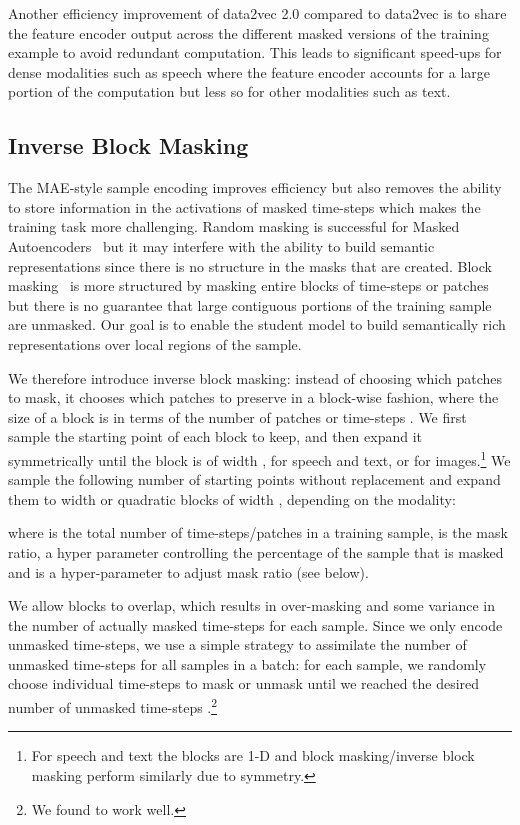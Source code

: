 \documentclass[nohyperref]{article}
\theoremstyle{plain}
\theoremstyle{definition}
\theoremstyle{remark}
\newcommand{\name}{data2vec 2.0}
\begin{document}
Another efficiency improvement of \name{} compared to data2vec is to share the feature encoder output across the different masked versions of the training example to avoid redundant computation.
This leads to significant speed-ups for dense modalities such as speech where the feature encoder accounts for a large portion of the computation but less so for other modalities such as text.



\subsection{Inverse Block Masking}
\label{sec:masking}

The MAE-style sample encoding improves efficiency but also removes the ability to store information in the activations of masked time-steps which makes the training task more challenging.
Random masking is successful for Masked Autoencoders~\citep{he2021mae} but it may interfere with the ability to build semantic representations since there is no structure in the masks that are created.
Block masking~\citep{bao2021beit} is more structured by masking entire blocks of time-steps or patches but there is no guarantee that large contiguous portions of the training sample are unmasked.
Our goal is to enable the student model to build semantically rich representations over local regions of the sample.

\insertEfficiencyPlot

We therefore introduce inverse block masking: instead of choosing which patches to mask, it chooses which patches to preserve in a block-wise fashion, where the size of a block is in terms of the number of patches or time-steps .
We first sample the starting point of each block to keep, and then expand it symmetrically until the block is of width , for speech and text, or  for images.\footnote{For speech and text the blocks are 1-D and block masking/inverse block masking perform similarly due to symmetry.}
We sample the following number of starting points without replacement and expand them to width  or quadratic blocks of width , depending on the modality: 

where  is the total number of time-steps/patches in a training sample,  is the mask ratio, a hyper parameter controlling the percentage of the sample that is masked and  is a hyper-parameter to adjust mask ratio (see below).

We allow blocks to overlap, which results in over-masking and some variance in the number of actually masked time-steps for each sample.
Since we only encode unmasked time-steps, we use a simple strategy to assimilate the number of unmasked time-steps for all samples in a batch:
for each sample, we randomly choose individual time-steps to mask or unmask until we reached the desired number of unmasked time-steps .\footnote{We found  to work well.}
\end{document}
